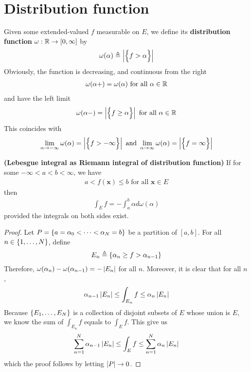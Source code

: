 \documentclass{report}
\begin{document}
\section{Distribution function}
\begin{mdframed}
Given some extended-valued $f$ measurable on $E$, we define its  \textbf{distribution function} $\omega:\mathbb{R} \rightarrow [0,\infty]$ by 
\begin{align*}
\omega (\alpha )\triangleq \left|\Big\{ f>\alpha  \Big\}\right|
\end{align*}
Obviously, the function is decreasing, and continuous from the right 
\begin{align*}
\omega (\alpha + )= \omega (\alpha )\text{ for all }\alpha \in\mathbb{R}
\end{align*}
and have the left limit 
\begin{align*}
\omega (\alpha -)= \left|\Big\{ f\geq \alpha   \Big\}\right|\text{ for all }\alpha \in\mathbb{R}
\end{align*}
This coincides with 
\begin{align*}
\lim_{\alpha \to -\infty} \omega (\alpha )=  \left|\Big\{ f>-\infty \Big\}\right|\text{ and }\lim_{\alpha \to \infty} \omega (\alpha )= \left|\Big\{ f=\infty \Big\}\right|
\end{align*}
\end{mdframed}
\begin{theorem}
\label{Lia}
\textbf{(Lebesgue integral as Riemann integral of distribution function)} If for some $-\infty < a <b<\infty$, we have 
\begin{align*}
a<f(\textbf{x})\leq b\text{ for all }\textbf{x} \in E
\end{align*}
then 
\begin{align*}
\int_E f= - \int_a^b \alpha d \omega (\alpha )
\end{align*}
provided the integrals on both sides exist. 
\end{theorem}
\begin{proof}
  Let $P= \{  a= \alpha_0 < \cdots < \alpha _N =b \}$ be a partition of $[a,b]$. For all $n \in \{ 1,\dots ,N \}$, define 
\begin{align*}
E_n \triangleq \{ \alpha_n \geq f>\alpha_{n-1} \}
\end{align*}
Therefore, $\omega (\alpha _n)-\omega (\alpha_{n-1})= - \left|E_n\right|$ for all $n$. Moreover, it is clear that for all $n$, 
\begin{align*}
\alpha_{n-1}\left|E_n\right| \leq \int_{E_n}f \leq \alpha_n \left|E_n\right|
\end{align*}
Because $\{ E_1,\dots , E_N \}$ is a collection of disjoint subsets of $E$ whose union is  $E$, we know the sum of  $\int_{E_n}f$ equals to $\int_E f$. This give us 
\begin{align*}
\sum_{n=1}^N \alpha _{n-1} \left|E_n\right| \leq \int_E f \leq \sum_{n=1}^N \alpha_n \left|E_n\right|
\end{align*}
which the proof follows by letting $\left|P\right|\to 0$. 

\end{proof}
\end{document}
